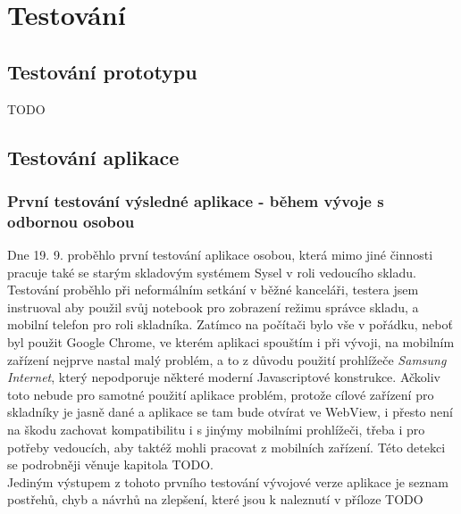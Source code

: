 \chapter{Testování}\label{testing}

\section{Testování prototypu}

TODO

\section{Testování aplikace}

\subsection{První testování výsledné aplikace - během vývoje s odbornou osobou}

Dne 19. 9. proběhlo první testování aplikace osobou, která mimo jiné činnosti pracuje také se starým skladovým systémem Sysel v roli vedoucího skladu.\\

Testování proběhlo při neformálním setkání v běžné kanceláři, testera jsem instruoval aby použil svůj notebook pro zobrazení režimu správce skladu, a mobilní telefon pro roli skladníka. Zatímco na počítači bylo vše v pořádku, neboť byl použit Google Chrome, ve kterém aplikaci spouštím i při vývoji, na mobilním zařízení nejprve nastal malý problém, a to z důvodu použití prohlížeče \emph{Samsung Internet}, který nepodporuje některé moderní Javascriptové konstrukce. Ačkoliv toto nebude pro samotné použití aplikace problém, protože cílové zařízení pro skladníky je jasně dané a aplikace se tam bude otvírat ve WebView, i přesto není na škodu zachovat kompatibilitu i s jinýmy mobilními prohlížeči, třeba i pro potřeby vedoucích, aby taktéž mohli pracovat z mobilních zařízení. Této detekci se podrobněji věnuje kapitola TODO.\\

Jediným výstupem z tohoto prvního testování vývojové verze aplikace je seznam postřehů, chyb a návrhů na zlepšení, které jsou k naleznutí v příloze TODO
